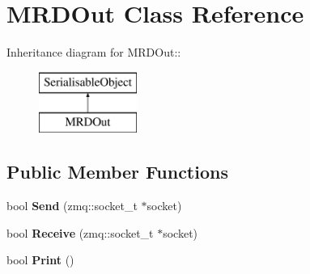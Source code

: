 \hypertarget{classMRDOut}{
\section{MRDOut Class Reference}
\label{classMRDOut}
}
Inheritance diagram for MRDOut::\begin{figure}[H]
\begin{center}
\leavevmode
\includegraphics[height=2cm]{classMRDOut}
\end{center}
\end{figure}
\subsection*{Public Member Functions}
\begin{DoxyCompactItemize}
\item 
\hypertarget{classMRDOut_a2c72c51c7288bd4ed73d4c9de0509150}{
bool {\bfseries Send} (zmq::socket\_\-t $\ast$socket)}
\label{classMRDOut_a2c72c51c7288bd4ed73d4c9de0509150}

\item 
\hypertarget{classMRDOut_a7e83eb6f2ac421109f907235d4211571}{
bool {\bfseries Receive} (zmq::socket\_\-t $\ast$socket)}
\label{classMRDOut_a7e83eb6f2ac421109f907235d4211571}

\item 
\hypertarget{classMRDOut_a956aa4f1b5746c9e12e7b69980d58b62}{
bool {\bfseries Print} ()}
\label{classMRDOut_a956aa4f1b5746c9e12e7b69980d58b62}

\end{DoxyCompactItemize}

